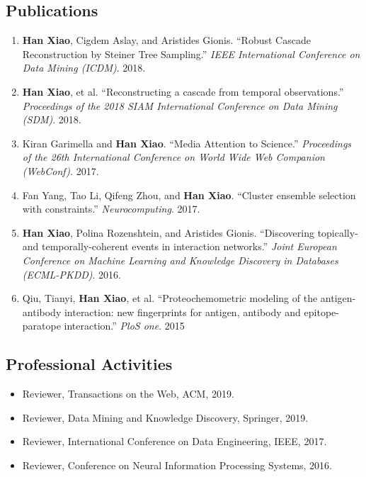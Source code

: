 \documentclass[12pt,]{scrartcl}
\begin{document}
\subsection{Publications}\label{publications}

\begin{enumerate}
  \leftskip-0.13in %
  \item {\textbf{Han Xiao}, Cigdem Aslay, and Aristides Gionis. ``Robust Cascade Reconstruction by Steiner Tree Sampling.'' \textit{IEEE International Conference on Data Mining (ICDM)}.  2018.}

  \item {\textbf{Han Xiao}, et al. ``Reconstructing a cascade from temporal observations.'' \textit{Proceedings of the 2018 SIAM International Conference on Data Mining (SDM)}. 2018.}
  
  \item {Kiran Garimella and \textbf{Han Xiao}. ``Media Attention to Science.'' \textit{Proceedings of the 26th International Conference on World Wide Web Companion (WebConf)}. 2017.}

  \item {Fan Yang, Tao Li, Qifeng Zhou, and \textbf{Han Xiao}. ``Cluster ensemble selection with constraints.'' \textit{Neurocomputing}. 2017.}

  \item {\textbf{Han Xiao}, Polina Rozenshtein, and Aristides Gionis. ``Discovering topically-and temporally-coherent events in interaction networks.'' \textit{Joint European Conference on Machine Learning and Knowledge Discovery in Databases (ECML-PKDD)}.  2016.}

  \item {Qiu, Tianyi, \textbf{Han Xiao}, et al. ``Proteochemometric modeling of the antigen-antibody interaction: new fingerprints for antigen, antibody and epitope-paratope interaction.'' \textit{PloS one}.  2015}
\end{enumerate}



\subsection{Professional Activities}\label{professional-activities}

\begin{itemize}
  \leftskip-0.25in
  \item Reviewer, Transactions on the Web, ACM, 2019.
  \item Reviewer, Data Mining and Knowledge Discovery, Springer, 2019.
  \item Reviewer, International Conference on Data Engineering, IEEE, 2017.
  \item Reviewer, Conference on Neural Information Processing Systems, 2016.
\end{itemize}
\end{document}
